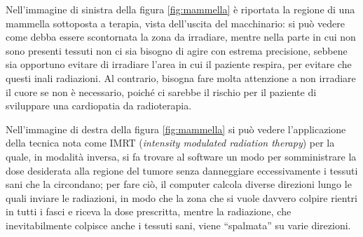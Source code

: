 \documentclass{report}
\newcommand{\virgolette}[1]{``#1''}
\newcommand{\figref}[1]{figura \ref{#1}}
\numberwithin{equation}{section}
\numberwithin{figure}{section}
\begin{document}
Nell'immagine di sinistra della \figref{fig:mammella} è riportata la regione di una mammella sottoposta a terapia, vista dell'uscita del macchinario: si può vedere come debba essere scontornata la zona da irradiare, mentre nella parte in cui non sono presenti tessuti non ci sia bisogno di agire con estrema precisione, sebbene sia opportuno evitare di irradiare l'area in cui il paziente respira, per evitare che questi inali radiazioni. Al contrario, bisogna fare molta attenzione a non irradiare il cuore se non è necessario, poiché ci sarebbe il rischio per il paziente di sviluppare una cardiopatia da radioterapia.

Nell'immagine di destra della \figref{fig:mammella} si può vedere l'applicazione della tecnica nota come IMRT (\textit{intensity modulated radiation therapy}) per la quale, in modalità inversa, si fa trovare al software un modo per somministrare la dose desiderata alla regione del tumore senza danneggiare eccessivamente i tessuti sani che la circondano; per fare ciò, il computer calcola diverse direzioni lungo le quali inviare le radiazioni, in modo che la zona che si vuole davvero colpire rientri in tutti i fasci e riceva la dose prescritta, mentre la radiazione, che inevitabilmente colpisce anche i tessuti sani, viene \virgolette{spalmata} su varie direzioni.
\end{document}
